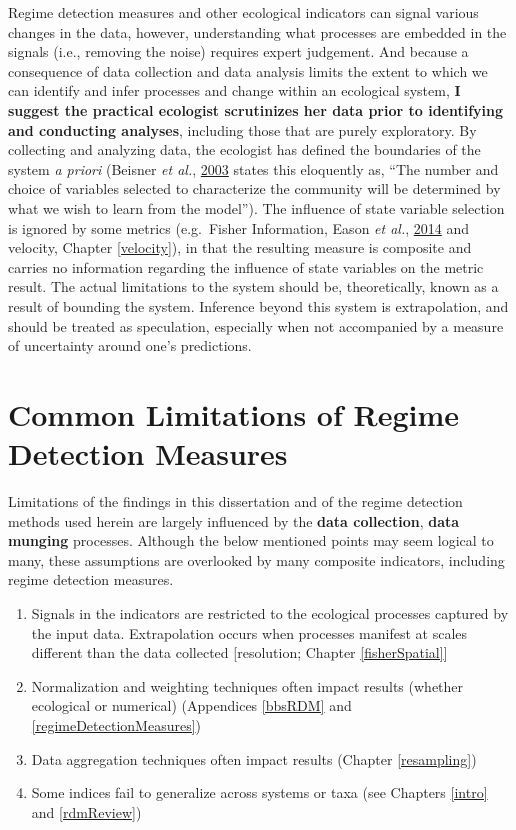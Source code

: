 \documentclass[print]{nuthesis}
\begin{document}
Regime detection measures and other ecological indicators can signal various changes in the data, however, understanding what processes are embedded in the signals (i.e., removing the noise) requires expert judgement. And because a consequence of data collection and data analysis limits the extent to which we can identify and infer processes and change within an ecological system, \textbf{I suggest the practical ecologist scrutinizes her data prior to identifying and conducting analyses}, including those that are purely exploratory. By collecting and analyzing data, the ecologist has defined the boundaries of the system \emph{a priori} (Beisner \emph{et al.}, \protect\hyperlink{ref-beisner2003alternative}{2003} states this eloquently as, ``The number and choice of variables selected to characterize the community will be determined by what we wish to learn from the model''). The influence of state variable selection is ignored by some metrics (e.g.~Fisher Information, Eason \emph{et al.}, \protect\hyperlink{ref-eason2014managing}{2014} and velocity, Chapter \ref{velocity}), in that the resulting measure is composite and carries no information regarding the influence of state variables on the metric result.
The actual limitations to the system should be, theoretically, known as a result of bounding the system. Inference beyond this system is extrapolation, and should be treated as speculation, especially when not accompanied by a measure of uncertainty around one's predictions.

\hypertarget{common-limitations-of-regime-detection-measures}{%
\section{Common Limitations of Regime Detection Measures}\label{common-limitations-of-regime-detection-measures}}

Limitations of the findings in this dissertation and of the regime detection methods used herein are largely influenced by the \textbf{data collection}, \textbf{data munging} processes. Although the below mentioned points may seem logical to many, these assumptions are overlooked by many composite indicators, including regime detection measures.
\begin{enumerate}
\def\labelenumi{\arabic{enumi}.}
\tightlist
\item
  Signals in the indicators are restricted to the ecological processes captured by the input data. Extrapolation occurs when processes manifest at scales different than the data collected {[}resolution; Chapter \ref{fisherSpatial}{]}
\item
  Normalization and weighting techniques often impact results (whether ecological or numerical) (Appendices \ref{bbsRDM} and \ref{regimeDetectionMeasures})
\item
  Data aggregation techniques often impact results (Chapter \ref{resampling})
\item
  Some indices fail to generalize across systems or taxa (see Chapters \ref{intro} and \ref{rdmReview})
\end{enumerate}
\appendix
\end{document}

